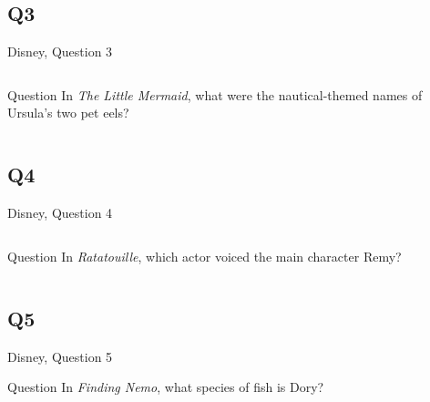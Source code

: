 \documentclass[11pt]{beamer}
\begin{document}
\subsection*{Q3}
\begin{frame}[t]{Disney, Question 3}
\begin{columns}[T,totalwidth=\linewidth]
\begin{column}{0.32\linewidth}
\begin{block}{Question}
In \emph{The Little Mermaid}, what were the nautical-themed names of Ursula's two pet eels?
\end{block}
\end{column}
\begin{column}{0.65\linewidth}
\begin{center}
\texttt{[image: \{Images/flotsamjetsam]}.jpg}
\end{center}
\end{column}
\end{columns}
\end{frame}
\subsection*{Q4}
\begin{frame}[t]{Disney, Question 4}
\begin{columns}[T,totalwidth=\linewidth]
\begin{column}{0.32\linewidth}
\begin{block}{Question}
In \emph{Ratatouille}, which actor voiced the main character Remy?
\end{block}
\end{column}
\begin{column}{0.65\linewidth}
\begin{center}
\texttt{[image: \{Images/remy]}.jpg}
\end{center}
\end{column}
\end{columns}
\end{frame}
\subsection*{Q5}
\begin{frame}[t]{Disney, Question 5}
\begin{block}{Question}
In \emph{Finding Nemo}, what species of fish is Dory?
\end{block}
\end{frame}
\end{document}
